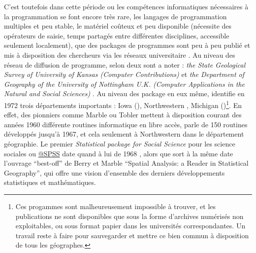 C'est toutefois dans cette période ou les compétences informatiques nécessaires à la programmation se font encore très rare, les langages de programmation multiples et peu stable, le matériel coûteux et peu disponible (nécessite des opérateurs de saisie, temps partagés entre différentes disciplines, accessible seulement localement), que des packages de programmes sont peu à peu publié et mis à disposition des chercheurs via les réseaux universitaire \autocite{Haggett1969}.
Au niveau des réseau de diffusion de programme, selon \textcite[20-21]{Greer1972} deux sont a noter : \textit{the State Geological Survey of University of Kansas (Computer Contributions)}  et \textit{ the Department of Geography of the University of Nottingham U.K. (Computer Applications in the Natural and Social Sciences) }. Au niveau des package en eux même, \textcite[20-21]{Greer1972} identifie en 1972 trois départements importants : Iowa (\autocite{Wittick1968}), Northwestern \autocite{Marble1967}, Michigan (\autocite{Tobler1970c})\footnote{Ces progammes sont malheureusement impossible à trouver, et les publications ne sont disponibles que sous la forme d'archives numérisés non exploitables, ou sous format papier dans les universités correspondantes. Un travail reste à faire pour sauvegarder et mettre ce bien commun à disposition de tous les géographes.}. En effet, des pionniers comme Marble ou Tobler mettent à disposition courant des années 1960 différente routines informatique en libre accès, \textcite[3]{Marble1967} parle de 150 routines développés jusqu'à 1967, et cela seulement à Northwestern dans le département géographie. Le premier \textit{Statistical package for Social Science} pour les science sociales ou \href{http://en.wikipedia.org/wiki/SPSS}{@SPSS} date quand à lui de 1968 \autocite{Barnes2011}, alors que sort à la même date l'ouvrage \foreignquote{english}{best-off} de Berry et Marble \foreignquote{english}{Spatial Analysis: a Reader in Statistical Geography}, qui offre une vision d'ensemble des derniers développements statistiques et mathématiques.



